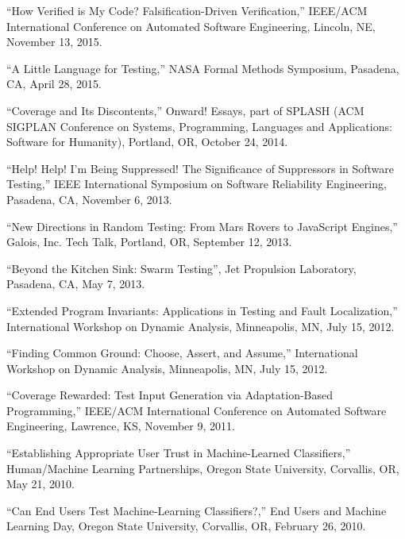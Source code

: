 \documentclass[ComputerScience]{vita}
\begin{document}
\begin{vita}
\begin{Selected Presentations}
\item ``How Verified is My Code?  Falsification-Driven Verification,'' IEEE/ACM International Conference on Automated Software Engineering, Lincoln, NE, November 13, 2015.

\item ``A Little Language for Testing,'' NASA Formal Methods Symposium, Pasadena, CA, April 28, 2015.

\item ``Coverage and Its Discontents,'' Onward! Essays, part of SPLASH (ACM SIGPLAN Conference on Systems, Programming, Languages and Applications: Software for Humanity), Portland, OR, October 24, 2014.

\item ``Help! Help! I'm Being Suppressed! The Significance of Suppressors in Software Testing,'' IEEE International Symposium on Software Reliability Engineering, Pasadena, CA, November 6, 2013.

\item ``New Directions in Random Testing: From Mars Rovers to JavaScript Engines,'' Galois, Inc. Tech Talk, Portland, OR, September 12, 2013.

\item ``Beyond the Kitchen Sink: Swarm Testing'', Jet Propulsion Laboratory, Pasadena, CA, May 7, 2013.

\item ``Extended Program Invariants: Applications in Testing and Fault Localization,'' International Workshop on Dynamic Analysis, Minneapolis, MN, July 15, 2012.

\item ``Finding Common Ground: Choose, Assert, and Assume,'' International Workshop on Dynamic Analysis, Minneapolis, MN, July 15, 2012.

\item ``Coverage Rewarded: Test Input Generation via Adaptation-Based Programming,'' IEEE/ACM International Conference on Automated Software Engineering, Lawrence, KS, November 9, 2011.

\item ``Establishing Appropriate User Trust in Machine-Learned Classifiers,'' Human/Machine Learning Partnerships, Oregon State University, Corvallis, OR, May 21, 2010.

\item ``Can End Users Test Machine-Learning Classifiers?,'' End Users and Machine Learning Day, Oregon State University, Corvallis, OR, February 26, 2010.


\end{Selected Presentations}
\end{vita}
\end{document}
